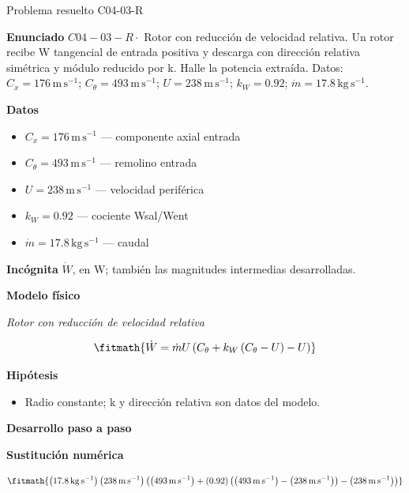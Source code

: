 \documentclass[10pt,openany]{book}
\begin{document}
\begin{studiumworked}{Problema resuelto C04-03-R}


\noindent\textbf{Enunciado}
\(C04-03-R \cdot\) Rotor con reducción de velocidad relativa. Un rotor recibe W tangencial de entrada positiva y descarga con dirección relativa simétrica y módulo reducido por k. Halle la potencia extraída. Datos: \(C_x=176\, \mathrm{m}\,\mathrm{s}^{-1}\); \(C_\theta=493\, \mathrm{m}\,\mathrm{s}^{-1}\); \(U=238\, \mathrm{m}\,\mathrm{s}^{-1}\); \(k_W=0.92\); \(\dot m=17.8\, \mathrm{kg}\,\mathrm{s}^{-1}\).

\noindent\textbf{Datos}
\begin{itemize}
\item $C_x = 176\,\mathrm{m}\,\mathrm{s}^{-1}$ — componente axial entrada
\item $C_\theta = 493\,\mathrm{m}\,\mathrm{s}^{-1}$ — remolino entrada
\item $U = 238\,\mathrm{m}\,\mathrm{s}^{-1}$ — velocidad periférica
\item $k_W = 0.92$ — cociente Wsal/Went
\item $\dot m = 17.8\,\mathrm{kg}\,\mathrm{s}^{-1}$ — caudal
\end{itemize}

\noindent\textbf{Incógnita}
$\dot{W}$, en $\mathrm{W}$; también las magnitudes intermedias desarrolladas.

\noindent\textbf{Modelo físico}

\noindent\textit{Rotor con reducción de velocidad relativa}

\[
\fitmath{\dot{W}=\dot m U \left(C_\theta + k_W \left(C_\theta - U\right) - U\right)}
\]

\noindent\textbf{Hipótesis}
\begin{itemize}
\item Radio constante; k y dirección relativa son datos del modelo.
\end{itemize}

\noindent\textbf{Desarrollo paso a paso}



\noindent\textbf{Sustitución numérica}

\[
\fitmath{\left(17.8\,\mathrm{kg}\,\mathrm{s}^{-1}\right) \left(238\,\mathrm{m}\,\mathrm{s}^{-1}\right) \left(\left(493\,\mathrm{m}\,\mathrm{s}^{-1}\right) + \left(0.92\right) \left(\left(493\,\mathrm{m}\,\mathrm{s}^{-1}\right) - \left(238\,\mathrm{m}\,\mathrm{s}^{-1}\right)\right) - \left(238\,\mathrm{m}\,\mathrm{s}^{-1}\right)\right)}
\]


\end{studiumworked}
\end{document}
